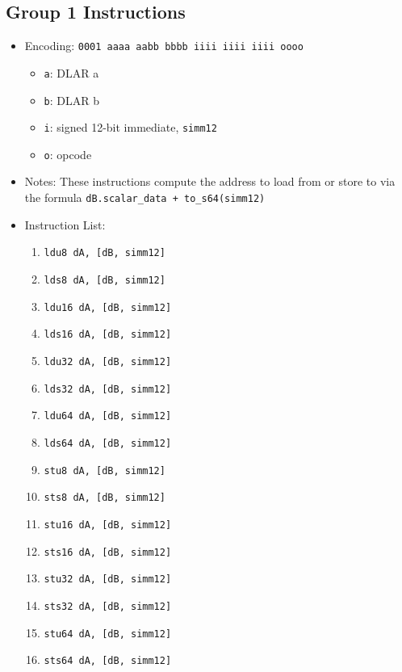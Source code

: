 \documentclass{article}
\begin{document}
	\subsection{Group 1 Instructions}
		\begin{itemize}
		\item Encoding:  \texttt{0001 aaaa aabb bbbb  iiii iiii iiii oooo}
			\begin{itemize}
			\item \texttt{a}:  DLAR a
			\item \texttt{b}:  DLAR b
			\item \texttt{i}:  signed 12-bit immediate, \texttt{simm12}
			\item \texttt{o}:  opcode
			\end{itemize}
		\item Notes:
			These instructions compute the address to load from or store to
			via the formula \texttt{dB.scalar\_data + to\_s64(simm12)}
		\item Instruction List:
			\begin{enumerate}
			\item \texttt{ldu8 dA, [dB, simm12]}
			\item \texttt{lds8 dA, [dB, simm12]}
			\item \texttt{ldu16 dA, [dB, simm12]}
			\item \texttt{lds16 dA, [dB, simm12]}

			\item \texttt{ldu32 dA, [dB, simm12]}
			\item \texttt{lds32 dA, [dB, simm12]}
			\item \texttt{ldu64 dA, [dB, simm12]}
			\item \texttt{lds64 dA, [dB, simm12]}

			\item \texttt{stu8 dA, [dB, simm12]}
			\item \texttt{sts8 dA, [dB, simm12]}
			\item \texttt{stu16 dA, [dB, simm12]}
			\item \texttt{sts16 dA, [dB, simm12]}

			\item \texttt{stu32 dA, [dB, simm12]}
			\item \texttt{sts32 dA, [dB, simm12]}
			\item \texttt{stu64 dA, [dB, simm12]}
			\item \texttt{sts64 dA, [dB, simm12]}
			\end{enumerate}
		\end{itemize}
\end{document}
